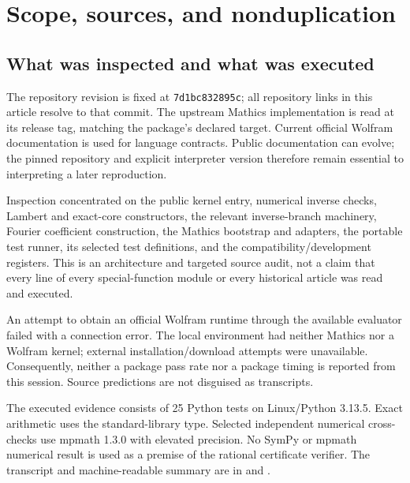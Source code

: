 \documentclass[11pt,letterpaper]{article}
\newcommand{\code}[1]{\texttt{\detokenize{#1}}}
\begin{document}
\section{Scope, sources, and nonduplication}
\subsection{What was inspected and what was executed}

The repository revision is fixed at \texttt{7d1bc832895c}; all repository links in this article resolve to that commit. The upstream Mathics implementation is read at its \code{10.0.1} release tag, matching the package's declared target. Current official Wolfram documentation is used for language contracts. Public documentation can evolve; the pinned repository and explicit interpreter version therefore remain essential to interpreting a later reproduction.\cite{snapshot,mathics-doc,upstream-calculus,upstream-nevaluator}

Inspection concentrated on the public kernel entry, numerical inverse checks, Lambert and exact-core constructors, the relevant inverse-branch machinery, Fourier coefficient construction, the Mathics bootstrap and adapters, the portable test runner, its selected test definitions, and the compatibility/development registers. This is an architecture and targeted source audit, not a claim that every line of every special-function module or every historical article was read and executed.

An attempt to obtain an official Wolfram runtime through the available evaluator failed with a connection error. The local environment had neither Mathics nor a Wolfram kernel; external installation/download attempts were unavailable. Consequently, neither a package pass rate nor a package timing is reported from this session. Source predictions are not disguised as transcripts.

The executed evidence consists of 25 Python tests on Linux/Python 3.13.5. Exact arithmetic uses the standard-library \code{Fraction} type. Selected independent numerical cross-checks use mpmath 1.3.0 with elevated precision. No SymPy or mpmath numerical result is used as a premise of the rational certificate verifier. The transcript and machine-readable summary are in  and .
\end{document}
